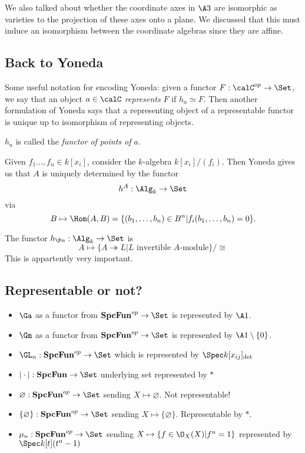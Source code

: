 \documentclass[12pt]{article}
\newcommand{\SpcFun}{\mathbf{SpcFun}}
\begin{document}
We also talked about whether the coordinate axes in $\A3$ are isomorphic as varieties to the projection 
of these axes onto a plane. We discussed that this must induce an isomorphism between the coordinate algebras since they are affine.

\subsection{Back to Yoneda}
Some useful notation for encoding Yoneda: given a functor $F:\calC^{op}\to\Set$, we say that an object $a\in\calC$
\textit{represents} $F$ if $h_a\simeq F$. Then another formulation of Yoneda says that a representing object of a representable functor is unique up to isomorphism of
representing objects.
\begin{center}
\end{center}
\begin{rmk}
	$h_a$ is called the \textit{functor of points of $a$.}
\end{rmk}
\begin{ex}
Given $f_1\dots,f_n\in k[x_i]$, consider the $k$-algebra $k[x_i]/(f_i)$. Then Yoneda gives us that $A$ is uniquely
determined by the functor 
\[h^A:\Alg_k\to\Set\]
via
\[B\mapsto \Hom(A,B)=\{(b_1,\dots,b_n)\in B^n|f_i(b_1,\dots,b_n)=0\}.\]
\end{ex}
\begin{ex}
	The functor $h_{\P n}:\Alg_k\to\Set$ is 
	\[A\mapsto \{A\twoheadrightarrow L| L\text{ invertible $A$-module}\}/\cong\]
	This is appartently very important.
\end{ex}

\subsection{Representable or not?}
\begin{itemize}
	\item $\Ga$ as a functor from $\SpcFun^{op}\to\Set$ is represented by $\A1$.
	\item $\Gm$ as a functor from $\SpcFun^{op}\to\Set$ is represented by $\A1\setminus\{0\}$.
	\item $\GL_n:\SpcFun^{op}\to\Set$ which is represented by $\Spec k[x_{ij}]_{\det}$
	\item $|\cdot|:\SpcFun\to\Set$ underlying set represented by $\ast$
	\item $\varnothing:\SpcFun^{op}\to\Set$ sending $X\mapsto\varnothing$. Not representable!
	\item $\{\varnothing\}:\SpcFun^{op}\to\Set$ sending $X\mapsto\{\varnothing\}$. Representable by $\ast$.
	\item $\mu_n:\SpcFun^{op}\to\Set$ sending $X\mapsto\{f\in\O_X(X)|f^n=1\}$ represented by $\Spec k[t](t^n-1)$
\end{itemize}
\end{document}
